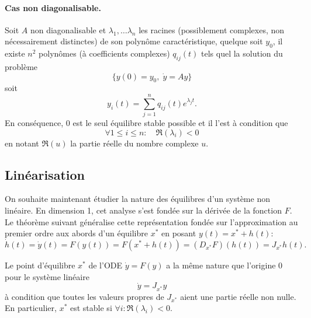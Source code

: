 \paragraph*{Cas non diagonalisable.}

\begin{theorem}
  Soit $A$ non diagonalisable et $\lambda_1, \dots \lambda_n$ les racines (possiblement complexes, non nécessairement distinctes) de son polynôme caractéristique, quelque soit $y_0$, il existe $n^2$ polynômes (à coefficients complexes) $q_{ij}(t)$ tels quel la solution du problème
  $$
  \{y(0) = y_0, \; \dot y = A y\}
  $$
  soit
  $$
  y_i(t) = \sum_{j=1}^n q_{ij}(t) e^{\lambda_j t}.
  $$
  En conséquence, 0 est le seul équilibre stable possible et il l'est à condition que
  $$
  \forall 1 \leq i \leq n: \quad \Re(\lambda_i) < 0
  $$
  en notant $\Re(u)$ la partie réelle du nombre complexe $u$.
\end{theorem}

\subsection{Linéarisation} 

On souhaite maintenant étudier la nature des équilibres d'un système non linéaire. En dimension 1, cet analyse s'est fondée sur la dérivée de la fonction $F$. Le théorème suivant généralise cette représentation fondée sur l'approximation au premier ordre aux abords d'un équilibre $x^*$ en posant $y(t) = x^* + h(t)$: 
$$
\dot h(t) = \dot y (t) = F(y(t)) = F(x^* + h(t)) = (D_{x^*} F)(h(t)) = J_{x^*} h(t).
$$

\begin{theorem}
  Le point d'équilibre $x^*$ de l'ODE $\dot y = F(y)$ a la même nature que l'origine $0$ pour le système linéaire 
  $$
  \dot y = J_{x^*} y
  $$
  à condition que toutes les valeurs propres de $J_{x^*}$ aient une partie réelle non nulle. \\
  En particulier, $x^*$ est stable si $\forall i: \Re(\lambda_i) < 0$.
\end{theorem}

